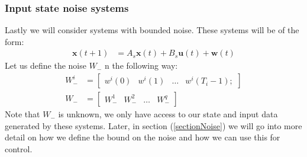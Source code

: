 \subsubsection*{Input state noise systems}
Lastly we will consider systems with bounded noise. These systems will be of the form:
\begin{align} \label{isnSystem}
	\mathbf{x}(t+1) &= A_s \mathbf{x}(t) + B_s \mathbf{u}(t) + \mathbf{w}(t)
\end{align}
Let us define the noise $W_-$ n the following way:
\begin{align*}
W_-^i &= \begin{bmatrix}	w^i(0) & w^i(1)& \dots & w^i(T_i-1); \end{bmatrix}\\
W_- &= \begin{bmatrix} W_-^1 & W_-^2 & \dots & W_-^q	\end{bmatrix}
\end{align*}
Note that $W_-$ is unknown, we only have access to our state and input data generated by these systems. Later, in section (\ref{sectionNoise}) we will go into more detail on how we define the bound on the noise and how we can use this for control.









